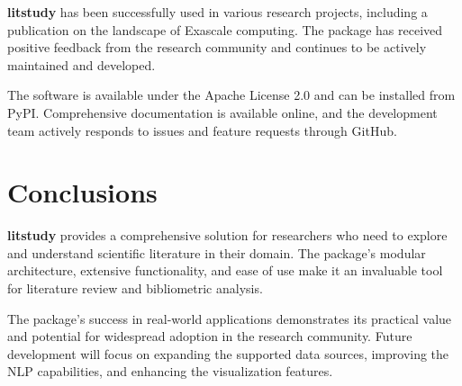 \documentclass{article}
\begin{document}
\textbf{litstudy} has been successfully used in various research projects, including a publication on the landscape of Exascale computing. The package has received positive feedback from the research community and continues to be actively maintained and developed.

The software is available under the Apache License 2.0 and can be installed from PyPI. Comprehensive documentation is available online, and the development team actively responds to issues and feature requests through GitHub.

\section{Conclusions}

\textbf{litstudy} provides a comprehensive solution for researchers who need to explore and understand scientific literature in their domain. The package's modular architecture, extensive functionality, and ease of use make it an invaluable tool for literature review and bibliometric analysis.

The package's success in real-world applications demonstrates its practical value and potential for widespread adoption in the research community. Future development will focus on expanding the supported data sources, improving the NLP capabilities, and enhancing the visualization features.
\end{document}
